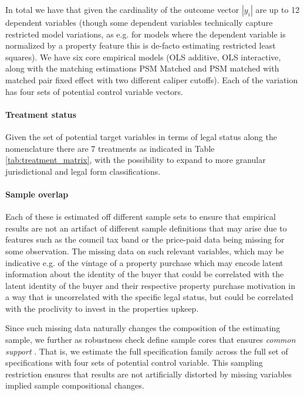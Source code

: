 \documentclass[12pt]{article}
\begin{document}
In total we have  that given the cardinality of the outcome vector $|y_{i}|$ are up to 12 dependent variables (though some dependent variables technically capture restricted model variations, as e.g. for models where the dependent variable is normalized by a property feature this is de-facto estimating restricted least squares). We have six core empirical models (OLS additive, OLS interactive, along with the matching estimations PSM Matched and PSM matched with matched pair fixed effect with two different caliper cutoffs). Each of the variation has four sets of potential control variable vectors. 

\paragraph{Treatment status}
Given the set of potential target variables in terms of legal status along the nomenclature there are 7 treatments as indicated in Table \ref{tab:treatment_matrix}, with the possibility to expand to more granular jurisdictional and legal form classifications.


\paragraph{Sample overlap} Each of these is estimated off different sample sets to ensure that empirical results are not an artifact of different sample definitions that may arise due to features such as the council tax band or the price-paid data being missing for some observation. The missing data on such relevant variables, which may be indicative e.g. of the vintage of a property purchase which may encode latent information about the identity of the buyer that could be correlated with the latent identity of the buyer and their respective property purchase motivation in a way that is uncorrelated with the specific legal status, but could be correlated with the proclivity to invest in the properties upkeep.

Since such missing data naturally changes the composition of the estimating sample, we further as robustness check define sample cores that ensures \emph{common support} . That is, we estimate the full specification family across the full set of specifications with four sets of potential control variable. This sampling restriction ensures that results are not artificially distorted by missing variables implied sample compositional changes.   
\end{document}
